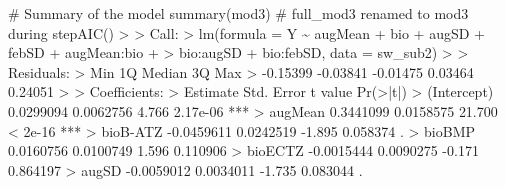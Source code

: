 \documentclass[
  letterpaper,
]{book}
\newenvironment{Shaded}{\begin{snugshade}}{\end{snugshade}}
\newcommand{\AttributeTok}[1]{\textcolor[rgb]{0.40,0.45,0.13}{#1}}
\newcommand{\CommentTok}[1]{\textcolor[rgb]{0.37,0.37,0.37}{#1}}
\newcommand{\DecValTok}[1]{\textcolor[rgb]{0.68,0.00,0.00}{#1}}
\newcommand{\ErrorTok}[1]{\textcolor[rgb]{0.68,0.00,0.00}{#1}}
\newcommand{\FloatTok}[1]{\textcolor[rgb]{0.68,0.00,0.00}{#1}}
\newcommand{\FunctionTok}[1]{\textcolor[rgb]{0.28,0.35,0.67}{#1}}
\newcommand{\NormalTok}[1]{\textcolor[rgb]{0.00,0.23,0.31}{#1}}
\newcommand{\SpecialCharTok}[1]{\textcolor[rgb]{0.37,0.37,0.37}{#1}}
\begin{document}
\begin{Shaded}
\begin{Highlighting}[]
\CommentTok{\# Summary of the model}
\FunctionTok{summary}\NormalTok{(mod3) }\CommentTok{\# full\_mod3 renamed to mod3 during stepAIC()}
\SpecialCharTok{\textgreater{}} 
\ErrorTok{\textgreater{}}\NormalTok{ Call}\SpecialCharTok{:}
\ErrorTok{\textgreater{}} \FunctionTok{lm}\NormalTok{(}\AttributeTok{formula =}\NormalTok{ Y }\SpecialCharTok{\textasciitilde{}}\NormalTok{ augMean }\SpecialCharTok{+}\NormalTok{ bio }\SpecialCharTok{+}\NormalTok{ augSD }\SpecialCharTok{+}\NormalTok{ febSD }\SpecialCharTok{+}\NormalTok{ augMean}\SpecialCharTok{:}\NormalTok{bio }\SpecialCharTok{+} 
\ErrorTok{\textgreater{}}\NormalTok{     bio}\SpecialCharTok{:}\NormalTok{augSD }\SpecialCharTok{+}\NormalTok{ bio}\SpecialCharTok{:}\NormalTok{febSD, }\AttributeTok{data =}\NormalTok{ sw\_sub2)}
\SpecialCharTok{\textgreater{}} 
\ErrorTok{\textgreater{}}\NormalTok{ Residuals}\SpecialCharTok{:}
\ErrorTok{\textgreater{}}\NormalTok{      Min       }\DecValTok{1}\NormalTok{Q   Median       }\DecValTok{3}\NormalTok{Q      Max }
\SpecialCharTok{\textgreater{}} \SpecialCharTok{{-}}\FloatTok{0.15399} \SpecialCharTok{{-}}\FloatTok{0.03841} \SpecialCharTok{{-}}\FloatTok{0.01475}  \FloatTok{0.03464}  \FloatTok{0.24051} 
\SpecialCharTok{\textgreater{}} 
\ErrorTok{\textgreater{}}\NormalTok{ Coefficients}\SpecialCharTok{:}
\ErrorTok{\textgreater{}}\NormalTok{                    Estimate Std. Error t value }\FunctionTok{Pr}\NormalTok{(}\SpecialCharTok{\textgreater{}}\ErrorTok{|}\NormalTok{t}\SpecialCharTok{|}\NormalTok{)    }
\SpecialCharTok{\textgreater{}}\NormalTok{ (Intercept)       }\FloatTok{0.0299094}  \FloatTok{0.0062756}   \FloatTok{4.766} \FloatTok{2.17e{-}06} \SpecialCharTok{**}\ErrorTok{*}
\ErrorTok{\textgreater{}}\NormalTok{ augMean           }\FloatTok{0.3441099}  \FloatTok{0.0158575}  \FloatTok{21.700}  \SpecialCharTok{\textless{}} \FloatTok{2e{-}16} \SpecialCharTok{**}\ErrorTok{*}
\ErrorTok{\textgreater{}}\NormalTok{ bioB}\SpecialCharTok{{-}}\NormalTok{ATZ         }\SpecialCharTok{{-}}\FloatTok{0.0459611}  \FloatTok{0.0242519}  \SpecialCharTok{{-}}\FloatTok{1.895} \FloatTok{0.058374}\NormalTok{ .  }
\SpecialCharTok{\textgreater{}}\NormalTok{ bioBMP            }\FloatTok{0.0160756}  \FloatTok{0.0100749}   \FloatTok{1.596} \FloatTok{0.110906}    
\SpecialCharTok{\textgreater{}}\NormalTok{ bioECTZ          }\SpecialCharTok{{-}}\FloatTok{0.0015444}  \FloatTok{0.0090275}  \SpecialCharTok{{-}}\FloatTok{0.171} \FloatTok{0.864197}    
\SpecialCharTok{\textgreater{}}\NormalTok{ augSD            }\SpecialCharTok{{-}}\FloatTok{0.0059012}  \FloatTok{0.0034011}  \SpecialCharTok{{-}}\FloatTok{1.735} \FloatTok{0.083044}\NormalTok{ .  }

\end{Highlighting}
\end{Shaded}
\end{document}
